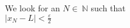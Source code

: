 \documentclass[preview]{standalone}
\begin{document}
\begin{center}
We look for an $N$$\in\:$$\mathbb{N}$ such that \\$|x_N - L| <$$\frac{\varepsilon}{2}$
\end{center}
\end{document}
